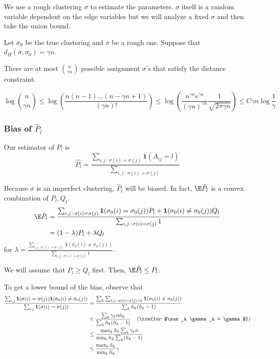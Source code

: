 \documentclass{article}
\begin{document}
We use a rough clustering $\sigma$ to estimate the parameters. $\sigma$ itself is a random variable dependent on the edge variables but we will analyze a fixed $\sigma$ and then take the union bound.

Let $\sigma_0$ be the true clustering and $\sigma$ be a rough one. 
Suppose that $d_H(\sigma, \sigma_0) = \gamma n$.

There are at most $\binom{n}{\gamma n}$ possible assignment $\sigma$'s that satisfy the distance constraint. 

\[
\log \binom{n}{\gamma n} \leq 
  \log \left( \frac{ n(n-1) ...(n-\gamma n+1) }{(\gamma n)!} \right) \leq
  \log \left( \frac{ n^{\gamma n} e^{\gamma n} }
     { (\gamma n)^{\gamma n} } \frac{1}{\sqrt{2\pi \gamma n}} \right)
 \leq C \gamma n \log \frac{1}{\gamma} 
\]



\subsubsection{Bias of $\hat{P}_l$}


Our estimator of $P_l$ is 
\[
\hat{P_l} = \frac{ \sum_{i,j \,:\, \sigma(i) = \sigma(j)} \mathbf{1}(A_{ij} = l) }{
                   \sum_{i,j \,:\, \sigma(i) = \sigma(j)} }
\]

Because $\sigma$ is an imperfect clustering, $\hat{P}_l$ will be biased. In fact, $\E \hat{P}_l$ is a convex combination of $P_l, Q_l$. 
\begin{align}
\E \hat{P_l} &= 
   \frac{ \sum_{i,j \,:\, \sigma(i) = \sigma(j)} \mathbf{1}(\sigma_0(i) = \sigma_0(j) ) P_l + 
               \mathbf{1}(\sigma_0(i) \neq \sigma_0(j)) Q_l }{
                   \sum_{i,j \,:\, \sigma(i) = \sigma(j)} 1 } \\
  &= (1 - \lambda) P_l + \lambda Q_l  \label{eqn:bias_simple_bound}
\end{align}
for $\lambda = \frac{\sum_{i,j \,:\, \sigma(i) = \sigma(j)} 
     \mathbf{1}(\sigma_0(i) \neq \sigma_0(j)) }{\sum_{i,j \,:\, \sigma(i) = \sigma(j)} 1}$.

We will assume that $P_l \geq Q_l$ first. Then, $\E \hat{P}_l \leq P_l$. 

To get a lower bound of the bias, observe that
\begin{align*}
\frac{\sum_{i,j} \mathbf{1}(\sigma(i) = \sigma(j)) \mathbf{1}(\sigma_0(i) \neq \sigma_0(j)) }{\sum_{i,j} \mathbf{1}(\sigma(i) = \sigma(j)) } &= 
   \frac{\sum_k \sum_{i,j \,:\, \sigma(i)=\sigma(j)=k} \mathbf{1}(\sigma_0(i) \neq \sigma_0(j))}{\sum_k \hat{n}_k (\hat{n}_k-1)} \\
  &\leq \frac{ \sum_k \gamma_k n \hat{n}_k }{\sum_k \hat{n}_k(\hat{n}_k - 1)} \quad
  \left(\trm{for $\sum_k \gamma_k = \gamma$}  \right) \\
  &\leq \frac{\max_k \hat{n}_k \sum_k \gamma_k n }{\min_k \hat{n}_k \sum_k (\hat{n}_k - 1)} \\
 &\leq \frac{\max_k \hat{n}_k }{\min_k \hat{n}_k} \gamma
\end{align*}
\end{document}
